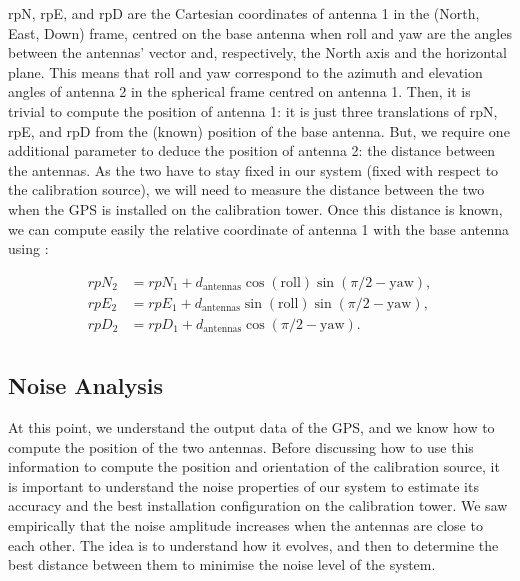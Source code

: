 \documentclass[../../thesis.tex]{subfiles}
\begin{document}
rpN, rpE, and rpD are the Cartesian coordinates of antenna 1 in the (North, East, Down) frame, centred on the base antenna when roll and yaw are the angles between the antennas' vector and, respectively, the North axis and the horizontal plane. This means that roll and yaw correspond to the azimuth and elevation angles of antenna 2 in the spherical frame centred on antenna 1. Then, it is trivial to compute the position of antenna 1: it is just three translations of rpN, rpE, and rpD from the (known) position of the base antenna. But, we require one additional parameter to deduce the position of antenna 2: the distance between the antennas. As the two have to stay fixed in our system (fixed with respect to the calibration source), we will need to measure the distance between the two when the GPS is installed on the calibration tower. Once this distance is known, we can compute easily the relative coordinate of antenna 1 with the base antenna using :

\begin{equation}
    \begin{split}
        rpN_2 & = rpN_1 + d_{\text{antennas}} \cos(\text{roll}) \sin(\pi/2-\text{yaw}),  \\
        rpE_2 & = rpE_1 + d_{\text{antennas}} \sin(\text{roll}) \sin(\pi/2 -\text{yaw}), \\
        rpD_2 & = rpD_1 + d_{\text{antennas}} \cos(\pi/2 - \text{yaw}).           \\
    \end{split}
\end{equation}

\subsection{Noise Analysis} \label{section: noise analysis}
At this point, we understand the output data of the GPS, and we know how to compute the position of the two antennas. Before discussing how to use this information to compute the position and orientation of the calibration source, it is important to understand the noise properties of our system to estimate its accuracy and the best installation configuration on the calibration tower. We saw empirically that the noise amplitude increases when the antennas are close to each other. The idea is to understand how it evolves, and then to determine the best distance between them to minimise the noise level of the system.
\end{document}
